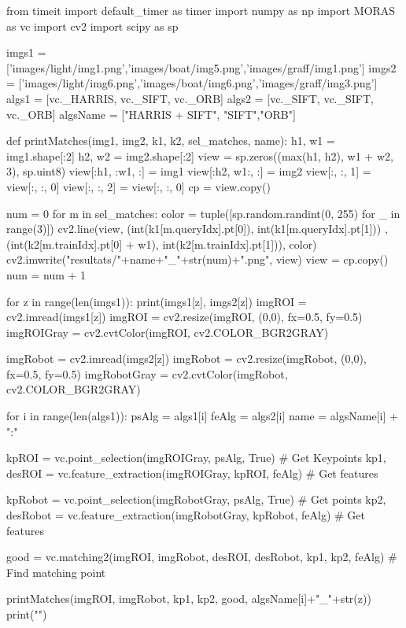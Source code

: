 \begin{python}
from timeit import default_timer as timer
import numpy as np
import MORAS as vc
import cv2
import scipy as sp

imgs1 = ['images/light/img1.png','images/boat/img5.png','images/graff/img1.png']
imgs2 = ['images/light/img6.png','images/boat/img6.png','images/graff/img3.png']
algs1 = [vc._HARRIS, vc._SIFT, vc._ORB]
algs2 = [vc._SIFT, vc._SIFT, vc._ORB]
algsName = ["HARRIS + SIFT", "SIFT","ORB"]

def printMatches(img1, img2, k1, k2, sel_matches, name):
	h1, w1 = img1.shape[:2]
	h2, w2 = img2.shape[:2]
	view = sp.zeros((max(h1, h2), w1 + w2, 3), sp.uint8)
	view[:h1, :w1, :] = img1  
	view[:h2, w1:, :] = img2
	view[:, :, 1] = view[:, :, 0]  
	view[:, :, 2] = view[:, :, 0]
	cp = view.copy()

	num = 0
	for m in sel_matches:
		color = tuple([sp.random.randint(0, 255) for _ in range(3)])
		cv2.line(view, (int(k1[m.queryIdx].pt[0]), int(k1[m.queryIdx].pt[1])) ,
			(int(k2[m.trainIdx].pt[0] + w1), int(k2[m.trainIdx].pt[1])), color)
		cv2.imwrite("resultats/"+name+"_"+str(num)+".png", view)
		view = cp.copy()
		num = num + 1

for z in range(len(imgs1)):
	print(imgs1[z], imgs2[z])
	imgROI = cv2.imread(imgs1[z])
	imgROI = cv2.resize(imgROI, (0,0), fx=0.5, fy=0.5)
	imgROIGray = cv2.cvtColor(imgROI, cv2.COLOR_BGR2GRAY)

	imgRobot = cv2.imread(imgs2[z])
	imgRobot = cv2.resize(imgRobot, (0,0), fx=0.5, fy=0.5)
	imgRobotGray = cv2.cvtColor(imgRobot, cv2.COLOR_BGR2GRAY)

	for i in range(len(algs1)):
		psAlg = algs1[i]
		feAlg = algs2[i]
		name = algsName[i] + ":"

		kpROI = vc.point_selection(imgROIGray, psAlg, True)				# Get Keypoints
		kp1, desROI = vc.feature_extraction(imgROIGray, kpROI, feAlg)	# Get features

		kpRobot = vc.point_selection(imgRobotGray, psAlg, True)					# Get points
		kp2, desRobot = vc.feature_extraction(imgRobotGray, kpRobot, feAlg)	# Get features

		good = vc.matching2(imgROI, imgRobot, desROI, desRobot,
			kp1, kp2, feAlg)	# Find matching point

		printMatches(imgROI, imgRobot, kp1, kp2, good, algsName[i]+"_"+str(z))
	print("\n")
\end{python}
